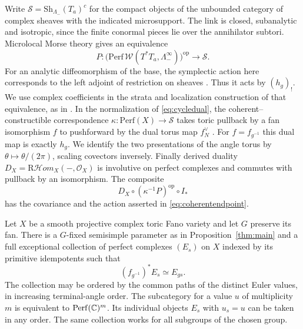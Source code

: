 Write $\mathcal S=\mathrm{Sh}_{\Lambda_-}(T_a)^c$ for the compact objects of the unbounded category of complex sheaves with the indicated microsupport. The link is closed, subanalytic and isotropic, since the finite conormal pieces lie over the annihilator subtori. Microlocal Morse theory gives an equivalence
\[
 P:\big(\mathrm{Perf}\,\mathcal W(T^*T_a,\Lambda_-^\infty)\big)^{\mathrm{op}}
                       \longrightarrow \mathcal S .
\]
For an analytic diffeomorphism of the base, the symplectic action here corresponds to the left adjoint of restriction on sheaves \cite[Theorem~1.1 and Proposition~1.3]{GPSmicro}. Thus it acts by $(h_g)_!$. We use complex coefficients in the strata and localization construction of that equivalence, as in \cite[Theorem~5.1]{FZ}. In the normalization of \eqref{eq:cycledual}, the coherent--constructible correspondence $\kappa:\mathrm{Perf}(X)\to\mathcal S$ takes toric pullback by a fan isomorphism $f$ to pushforward by the dual torus map $f_N^\vee$ \cite[\S9, (9.14), Remark~9.3 and Proposition~9.4]{Kuw}. For $f=f_{g^{-1}}$ this dual map is exactly $h_g$. We identify the two presentations of the angle torus by $\theta\mapsto\theta/(2\pi)$, scaling covectors inversely. Finally derived duality $D_X=\mathrm{R}\mathcal Hom_X(-,\mathcal O_X)$ is involutive on perfect complexes and commutes with pullback by an isomorphism. The composite
\[
                      D_X\circ(\kappa^{-1}P)^{\mathrm{op}}\circ I_*
\]
has the covariance and the action asserted in \eqref{eq:coherentendpoint}.

\begin{theorem}\label{thm:coherentcollection}
Let $X$ be a smooth projective complex toric Fano variety and let $G$ preserve its fan. There is a $G$-fixed semisimple parameter as in Proposition~\ref{thm:main} and a full exceptional collection of perfect complexes $(E_s)$ on $X$ indexed by its primitive idempotents such that
\[
                 (f_{g^{-1}})^* E_s\simeq E_{gs}.
\]
The collection may be ordered by the common paths of the distinct Euler values, in increasing terminal-angle order. The subcategory for a value $u$ of multiplicity $m$ is equivalent to $\mathrm{Perf}(\mathbb C)^m$. Its individual objects $E_s$ with $u_s=u$ can be taken in any order. The same collection works for all subgroups of the chosen group.
\end{theorem}


